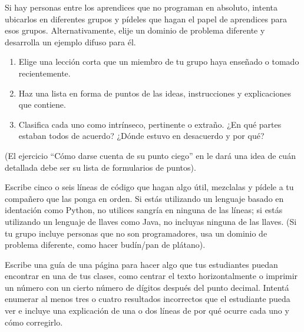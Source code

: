 Si hay personas entre los aprendices que no programan en absoluto,
intenta ubicarlos en diferentes grupos
y pídeles que hagan el papel de aprendices para esos grupos.
Alternativamente,
elije un dominio de problema diferente y desarrolla un ejemplo difuso para él.



\begin{enumerate}

\item
  Elige una lección corta que un miembro de tu grupo haya enseñado o tomado recientemente.

\item
  Haz una lista en forma de puntos de las ideas, instrucciones y explicaciones que contiene.

\item
  Clasifica cada uno como intrínseco, pertinente o extraño.
  ¿En qué partes estaban todos de acuerdo?
  ¿Dónde estuvo en desacuerdo y por qué?

\end{enumerate}

(El ejercicio ``Cómo darse cuenta de su punto ciego'' en 
le dará una idea de cuán detallada debe ser su lista de formularios de puntos).



Escribe cinco o seis líneas de código que hagan algo útil,
mezclalas y pídele a tu compañero que las ponga en orden.
Si estás utilizando un lenguaje basado en identación como Python,
no utilices sangría en ninguna de las líneas;
si estás utilizando un lenguaje de llaves como Java,
no incluyas ninguna de las llaves.
(Si tu grupo incluye personas que no son programadores,
usa un dominio de problema diferente,
como hacer budín/pan de plátano).



Escribe una guía de una página para hacer algo que tus estudiantes puedan encontrar en una de tus clases,
como centrar el texto horizontalmente
o imprimir un número con un cierto número de dígitos después del punto decimal.
Intentá enumerar al menos tres o cuatro resultados incorrectos que el estudiante pueda ver
e incluye una explicación de una o dos líneas
de por qué ocurre cada uno y cómo corregirlo.




